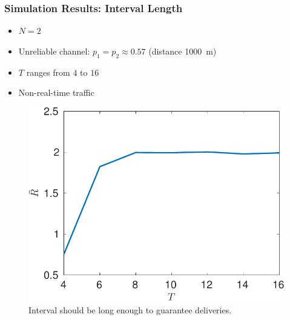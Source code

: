 \documentclass{beamer}
\begin{document}
\begin{frame}
\frametitle{Simulation Results: Interval Length}
\begin{itemize}
\item $N=2$
\item Unreliable channel: $p_1 = p_2 \approx 0.57$ (distance \SI{1000}{m})
\item $T$ ranges from $4$ to $16$
\item Non-real-time traffic
\end{itemize}
\begin{figure}[htbp]
  \centering
  \includegraphics[height=.5\textheight]{nonrealtime_throughput_T.pdf}
  \caption{Interval should be long enough to guarantee deliveries.}
\end{figure}
\end{frame}
\end{document}
